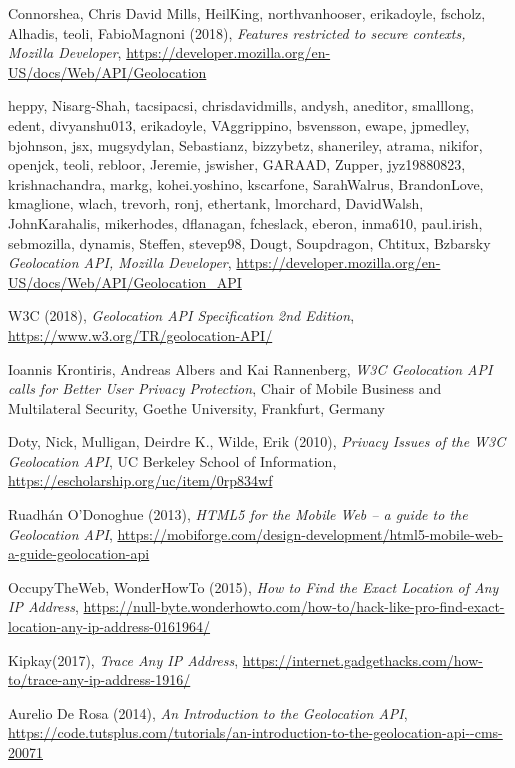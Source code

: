 \documentclass[11pt ,a4paper , twoside , openright ]{article}
\begin{document}
\begin{thebibliography}{99}
		\bibitem{}
	Connorshea, Chris David Mills, HeilKing, northvanhooser, erikadoyle, fscholz, Alhadis, teoli, FabioMagnoni (2018),
	\emph{Features restricted to secure contexts, Mozilla Developer},
	\url{https://developer.mozilla.org/en-US/docs/Web/API/Geolocation}
	
	\bibitem{}
	heppy, Nisarg-Shah, tacsipacsi, chrisdavidmills, andysh, aneditor, smalllong, edent, divyanshu013, erikadoyle, VAggrippino, bsvensson, ewape, jpmedley, bjohnson, jsx, mugsydylan, Sebastianz, bizzybetz, shaneriley, atrama, nikifor, openjck, teoli, rebloor, Jeremie, jswisher, GARAAD, Zupper, jyz19880823, krishnachandra, markg, kohei.yoshino, kscarfone, SarahWalrus, BrandonLove, kmaglione, wlach, trevorh, ronj, ethertank, lmorchard, DavidWalsh, JohnKarahalis, mikerhodes, dflanagan, fcheslack, eberon, inma610, paul.irish, sebmozilla, dynamis, Steffen, stevep98, Dougt, Soupdragon, Chtitux, Bzbarsky
	\emph{Geolocation API, Mozilla Developer},
	\url{https://developer.mozilla.org/en-US/docs/Web/API/Geolocation_API}
	
	\bibitem{}
	W3C (2018), 
	\emph{Geolocation API Specification 2nd Edition},
	\url{https://www.w3.org/TR/geolocation-API/}
	
	\bibitem{}
	Ioannis Krontiris, Andreas Albers and Kai Rannenberg,
	\emph{W3C Geolocation API calls for
		Better User Privacy Protection}, 
	Chair of Mobile Business and Multilateral Security, Goethe University, Frankfurt, Germany
	
	\bibitem{}
	Doty, Nick, Mulligan, Deirdre K., Wilde, Erik (2010),
	\emph{Privacy Issues of the W3C Geolocation API}, UC Berkeley School of Information, \url{https://escholarship.org/uc/item/0rp834wf}
	
	\bibitem{}
	Ruadhán O'Donoghue (2013),
	\emph{HTML5 for the Mobile Web – a guide to the Geolocation API}, \url{https://mobiforge.com/design-development/html5-mobile-web-a-guide-geolocation-api}
	
	\bibitem{}
	OccupyTheWeb, WonderHowTo (2015),
	\emph{How to Find the Exact Location of Any IP Address}, \url{https://null-byte.wonderhowto.com/how-to/hack-like-pro-find-exact-location-any-ip-address-0161964/}
	
	\bibitem{}
	Kipkay(2017), 
	\emph{Trace Any IP Address}, \url{https://internet.gadgethacks.com/how-to/trace-any-ip-address-1916/}
	
	\bibitem{}
	Aurelio De Rosa (2014),
	\emph{An Introduction to the Geolocation API},
	\url{https://code.tutsplus.com/tutorials/an-introduction-to-the-geolocation-api--cms-20071}
	

\end{thebibliography}
\end{document}
